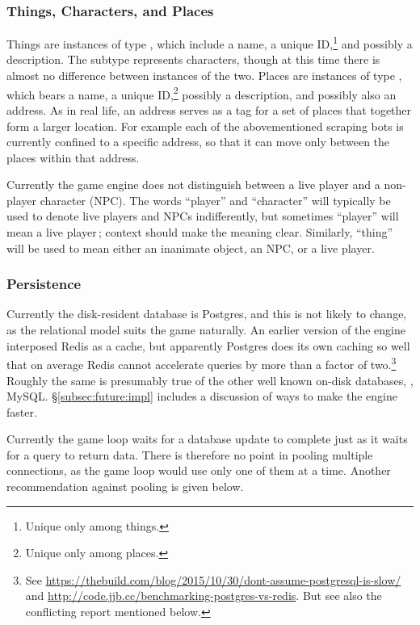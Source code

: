 \subsubsection{Things, Characters, and Places}

Things are instances of type , which include a name,
a unique ID,\footnote{Unique only among things.}
and
possibly a description.
The subtype  represents characters, though at this time there
is almost no difference between instances of the two.
Places are instances of type , which bears a name,
a unique ID,\footnote{Unique only among places.}
possibly a description, and possibly also an address.
As in real life, an address serves as a tag for a set of places that together
form a larger location.
For example each of the abovementioned scraping bots is currently confined to
a specific address, so that it can move only between the places within that
address.

Currently the game engine does not distinguish between a live player and a
non-player character (NPC).
The words ``player'' and
``character'' will typically be used to denote live players and
NPCs indifferently, but sometimes ``player'' will mean a live player\,;
context should make the meaning clear.
Similarly, ``thing'' will be used to
mean either an inanimate object, an NPC, or a live player.

\subsubsection{Persistence}

Currently the disk-resident database is Postgres, and this is not likely to
change, as the relational model suits the game naturally.
An earlier version of the engine interposed
Redis as a cache, but apparently Postgres does its own caching so well that on
average Redis cannot accelerate queries by more than a factor of two.\footnote{
See \url{https://thebuild.com/blog/2015/10/30/dont-assume-postgresql-is-slow/}
and \url{http://code.jjb.cc/benchmarking-postgres-vs-redis}.
But see
also the conflicting report mentioned below.} Roughly the same is presumably
true of the other well known on-disk databases, \eg, MySQL\@.
\S\ref{subsec:future:impl} includes a discussion of ways to make
the engine faster.

Currently the game loop waits for a database update to complete just as it
waits for a query to return data.
There is therefore no point in pooling multiple connections, as the game loop
would use only one of them at a time.
Another recommendation against pooling
is given below.

